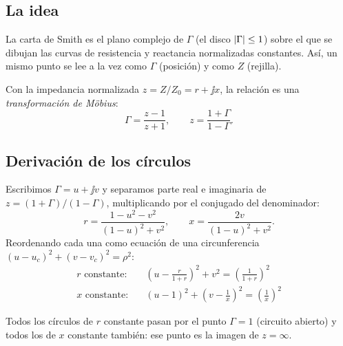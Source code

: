 \subsection{La idea}
La carta de Smith es el plano complejo de $\Gamma$ (el disco $\left|\Gamma\right|\le1$) sobre el que se dibujan las curvas de resistencia y
reactancia normalizadas constantes. Así, un mismo punto se lee a la vez como $\Gamma$ (posición) y como $Z$ (rejilla).

Con la impedancia normalizada $z = Z/Z_0 = r + \jj x$, la relación es una \emph{transformación de Möbius}:
\begin{equation}
  \Gamma = \frac{z - 1}{z + 1}, \qquad z = \frac{1 + \Gamma}{1 - \Gamma}.
\end{equation}
\begin{donde}
\end{donde}

\subsection{Derivación de los círculos}
Escribimos $\Gamma = u + \jj v$ y separamos parte real e imaginaria de $z = (1+\Gamma)/(1-\Gamma)$, multiplicando por el conjugado del denominador:
\begin{equation}
  r = \frac{1 - u^2 - v^2}{(1-u)^2 + v^2}, \qquad x = \frac{2v}{(1-u)^2 + v^2}.
\end{equation}
Reordenando cada una como ecuación de una circunferencia $(u - u_c)^2 + (v - v_c)^2 = \rho^2$:
\begin{align}
  \text{$r$ constante:}\quad & \left(u - \frac{r}{1+r}\right)^2 + v^2 = \left(\frac{1}{1+r}\right)^2 \\
  \text{$x$ constante:}\quad & (u - 1)^2 + \left(v - \frac1x\right)^2 = \left(\frac1x\right)^2
\end{align}
\begin{donde}
\end{donde}
Todos los círculos de $r$ constante pasan por el punto $\Gamma = 1$ (circuito abierto) y todos los de $x$ constante también: ese punto
es la imagen de $z = \infty$.

